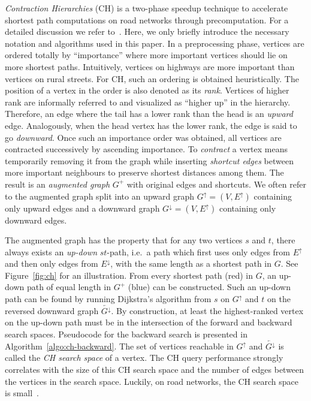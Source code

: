 \documentclass[manuscript,review]{acmart}
\newcommand*{\gchu}{G^{\uparrow}}
\newcommand*{\gchd}{G^{\downarrow}}
\newcommand*{\rgchd}{\overleftarrow{G^{\downarrow}}}
\newcommand*{\echu}{E^{\uparrow}}
\newcommand*{\echd}{E^{\downarrow}}
\begin{document}
\emph{Contraction Hierarchies} (CH) is a two-phase speedup technique to accelerate shortest path computations on road networks through precomputation.
For a detailed discussion we refer to~\cite{gssv-erlrn-12}.
Here, we only briefly introduce the necessary notation and algorithms used in this paper.
In a preprocessing phase, vertices are ordered totally by ``importance'' where more important vertices should lie on more shortest paths.
Intuitively, vertices on highways are more important than vertices on rural streets.
For CH, such an ordering is obtained heuristically.
The position of a vertex in the order is also denoted as its \emph{rank}.
Vertices of higher rank are informally referred to and visualized as ``higher up'' in the hierarchy.
Therefore, an edge where the tail has a lower rank than the head is an \emph{upward} edge.
Analogously, when the head vertex has the lower rank, the edge is said to go \emph{downward}.
Once such an importance order was obtained, all vertices are contracted successively by ascending importance.
To \emph{contract} a vertex means temporarily removing it from the graph while inserting \emph{shortcut edges} between more important neighbours to preserve shortest distances among them.
The result is an \emph{augmented graph} $G^+$ with original edges and shortcuts.
We often refer to the augmented graph split into an upward graph $\gchu = (V, \echu)$ containing only upward edges and a downward graph $\gchd = (V, \echu)$ containing only downward edges.

The augmented graph has the property that for any two vertices $s$ and $t$, there always exists an \emph{up-down} $st$-path, i.e.\ a path which first uses only edges from $\echu$ and then only edges from $\echd$, with the same length as a shortest path in $G$.
See Figure~\ref{fig:ch} for an illustration.
From every shortest path (red) in $G$, an up-down path of equal length in $G^+$ (blue) can be constructed.
Such an up-down path can be found by running Dijkstra's algorithm from $s$ on $\gchu$ and $t$ on the reversed downward graph $\rgchd$.
By construction, at least the highest-ranked vertex on the up-down path must be in the intersection of the forward and backward search spaces.
Pseudocode for the backward search is presented in Algorithm~\ref{algo:ch-backward}.
The set of vertices reachable in $\gchu$ and $\rgchd$ is called the \emph{CH search space} of a vertex.
The CH query performance strongly correlates with the size of this CH search space and the number of edges between the vertices in the search space.
Luckily, on road networks, the CH search space is small~\cite{gssv-erlrn-12,dgpw-crprn-13}.
\end{document}
